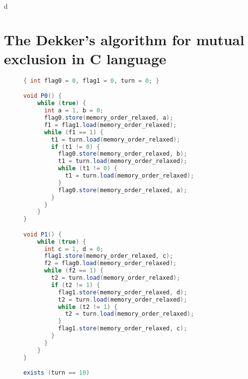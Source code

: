 d\newpage
\section{The Dekker's algorithm for mutual exclusion in C language}
\label{apx:dekker}

\begin{figure}
\begin{lstlisting}[language=Java,morekeywords={memory_order_relaxed}]
{ int flag0 = 0, flag1 = 0, turn = 0; }

void P0() {
    while (true) {
      int a = 1, b = 0;
      flag0.store(memory_order_relaxed, a);
      f1 = flag1.load(memory_order_relaxed);
      while (f1 == 1) {
        t1 = turn.load(memory_order_relaxed);
        if (t1 != 0) {
          flag0.store(memory_order_relaxed, b);
          t1 = turn.load(memory_order_relaxed);
          while (t1 != 0) {
            t1 = turn.load(memory_order_relaxed);
          }
          flag0.store(memory_order_relaxed, a);
        }
      }
    }
}

void P1() {
    while (true) {
      int c = 1, d = 0;
      flag1.store(memory_order_relaxed, c);
      f2 = flag0.load(memory_order_relaxed);
      while (f2 == 1) {
        t2 = turn.load(memory_order_relaxed);
        if (t2 != 1) {
          flag1.store(memory_order_relaxed, d);
          t2 = turn.load(memory_order_relaxed);
          while (t2 != 1) {
            t2 = turn.load(memory_order_relaxed);
          }
          flag1.store(memory_order_relaxed, c);
        }
      }
    }
}

exists (turn == 10)
\end{lstlisting}

\end{figure}
